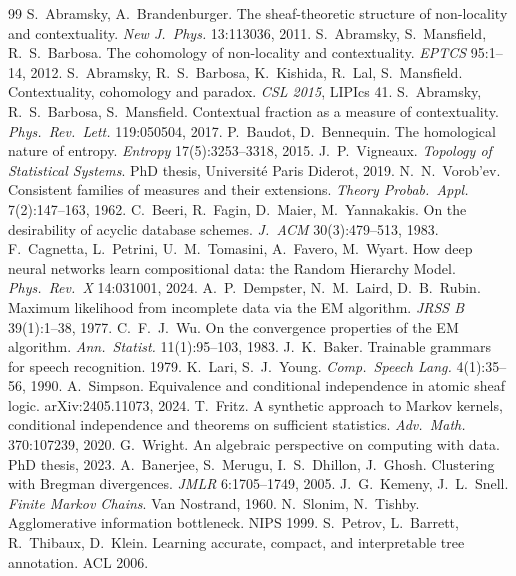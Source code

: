 \documentclass[11pt]{article}
\theoremstyle{definition}
\theoremstyle{remark}
\begin{document}
\begin{thebibliography}{99}\small
{} S.~Abramsky, A.~Brandenburger. The sheaf-theoretic structure of non-locality and contextuality. \emph{New J.\ Phys.} 13:113036, 2011.
 S.~Abramsky, S.~Mansfield, R.~S.~Barbosa. The cohomology of non-locality and contextuality. \emph{EPTCS} 95:1--14, 2012.
 S.~Abramsky, R.~S.~Barbosa, K.~Kishida, R.~Lal, S.~Mansfield. Contextuality, cohomology and paradox. \emph{CSL 2015}, LIPIcs 41.
 S.~Abramsky, R.~S.~Barbosa, S.~Mansfield. Contextual fraction as a measure of contextuality. \emph{Phys.\ Rev.\ Lett.} 119:050504, 2017.
 P.~Baudot, D.~Bennequin. The homological nature of entropy. \emph{Entropy} 17(5):3253--3318, 2015.
 J.~P.~Vigneaux. \emph{Topology of Statistical Systems}. PhD thesis, Universit\'e Paris Diderot, 2019.
 N.~N.~Vorob'ev. Consistent families of measures and their extensions. \emph{Theory Probab.\ Appl.} 7(2):147--163, 1962.
 C.~Beeri, R.~Fagin, D.~Maier, M.~Yannakakis. On the desirability of acyclic database schemes. \emph{J.\ ACM} 30(3):479--513, 1983.
 F.~Cagnetta, L.~Petrini, U.~M.~Tomasini, A.~Favero, M.~Wyart. How deep neural networks learn compositional data: the Random Hierarchy Model. \emph{Phys.\ Rev.\ X} 14:031001, 2024.
 A.~P.~Dempster, N.~M.~Laird, D.~B.~Rubin. Maximum likelihood from incomplete data via the EM algorithm. \emph{JRSS B} 39(1):1--38, 1977.
 C.~F.~J.~Wu. On the convergence properties of the EM algorithm. \emph{Ann.\ Statist.} 11(1):95--103, 1983.
 J.~K.~Baker. Trainable grammars for speech recognition. 1979. \quad K.~Lari, S.~J.~Young. \emph{Comp.\ Speech Lang.} 4(1):35--56, 1990.
 A.~Simpson. Equivalence and conditional independence in atomic sheaf logic. arXiv:2405.11073, 2024.
 T.~Fritz. A synthetic approach to Markov kernels, conditional independence and theorems on sufficient statistics. \emph{Adv.\ Math.} 370:107239, 2020.
 G.~Wright. An algebraic perspective on computing with data. PhD thesis, 2023.
 A.~Banerjee, S.~Merugu, I.~S.~Dhillon, J.~Ghosh. Clustering with Bregman divergences. \emph{JMLR} 6:1705--1749, 2005.
 J.~G.~Kemeny, J.~L.~Snell. \emph{Finite Markov Chains}. Van Nostrand, 1960.
 N.~Slonim, N.~Tishby. Agglomerative information bottleneck. NIPS 1999.
 S.~Petrov, L.~Barrett, R.~Thibaux, D.~Klein. Learning accurate, compact, and interpretable tree annotation. ACL 2006.

\end{thebibliography}
\end{document}
